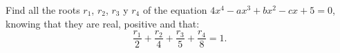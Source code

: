 Find all the roots $ r_{1}$,  $ r_{2}$,  $ r_{3}$ y $ r_{4}$ of the equation $ 4x^{4}-ax^{3}+bx^{2}-cx+5 = 0$,  knowing that they are real, positive and that:\[ \frac{r_{1}}{2}+\frac{r_{2}}{4}+\frac{r_{3}}{5}+\frac{r_{4}}{8}= 1.\]
